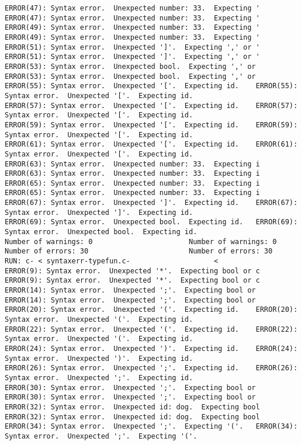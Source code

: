 \documentclass[12pt]{book}
\begin{document}
\begin{lstlisting}
ERROR(47): Syntax error.  Unexpected number: 33.  Expecting '	ERROR(47): Syntax error.  Unexpected number: 33.  Expecting '
ERROR(49): Syntax error.  Unexpected number: 33.  Expecting '	ERROR(49): Syntax error.  Unexpected number: 33.  Expecting '
ERROR(51): Syntax error.  Unexpected ']'.  Expecting ',' or '	ERROR(51): Syntax error.  Unexpected ']'.  Expecting ',' or '
ERROR(53): Syntax error.  Unexpected bool.  Expecting ',' or 	ERROR(53): Syntax error.  Unexpected bool.  Expecting ',' or 
ERROR(55): Syntax error.  Unexpected '['.  Expecting id.	ERROR(55): Syntax error.  Unexpected '['.  Expecting id.
ERROR(57): Syntax error.  Unexpected '['.  Expecting id.	ERROR(57): Syntax error.  Unexpected '['.  Expecting id.
ERROR(59): Syntax error.  Unexpected '['.  Expecting id.	ERROR(59): Syntax error.  Unexpected '['.  Expecting id.
ERROR(61): Syntax error.  Unexpected '['.  Expecting id.	ERROR(61): Syntax error.  Unexpected '['.  Expecting id.
ERROR(63): Syntax error.  Unexpected number: 33.  Expecting i	ERROR(63): Syntax error.  Unexpected number: 33.  Expecting i
ERROR(65): Syntax error.  Unexpected number: 33.  Expecting i	ERROR(65): Syntax error.  Unexpected number: 33.  Expecting i
ERROR(67): Syntax error.  Unexpected ']'.  Expecting id.	ERROR(67): Syntax error.  Unexpected ']'.  Expecting id.
ERROR(69): Syntax error.  Unexpected bool.  Expecting id.	ERROR(69): Syntax error.  Unexpected bool.  Expecting id.
Number of warnings: 0						Number of warnings: 0
Number of errors: 30						Number of errors: 30
RUN: c- < syntaxerr-typefun.c-				      <
ERROR(9): Syntax error.  Unexpected '*'.  Expecting bool or c	ERROR(9): Syntax error.  Unexpected '*'.  Expecting bool or c
ERROR(14): Syntax error.  Unexpected ';'.  Expecting bool or 	ERROR(14): Syntax error.  Unexpected ';'.  Expecting bool or 
ERROR(20): Syntax error.  Unexpected '('.  Expecting id.	ERROR(20): Syntax error.  Unexpected '('.  Expecting id.
ERROR(22): Syntax error.  Unexpected '('.  Expecting id.	ERROR(22): Syntax error.  Unexpected '('.  Expecting id.
ERROR(24): Syntax error.  Unexpected ')'.  Expecting id.	ERROR(24): Syntax error.  Unexpected ')'.  Expecting id.
ERROR(26): Syntax error.  Unexpected ';'.  Expecting id.	ERROR(26): Syntax error.  Unexpected ';'.  Expecting id.
ERROR(30): Syntax error.  Unexpected ';'.  Expecting bool or 	ERROR(30): Syntax error.  Unexpected ';'.  Expecting bool or 
ERROR(32): Syntax error.  Unexpected id: dog.  Expecting bool	ERROR(32): Syntax error.  Unexpected id: dog.  Expecting bool
ERROR(34): Syntax error.  Unexpected ';'.  Expecting '('.	ERROR(34): Syntax error.  Unexpected ';'.  Expecting '('.

\end{lstlisting}
\end{document}
